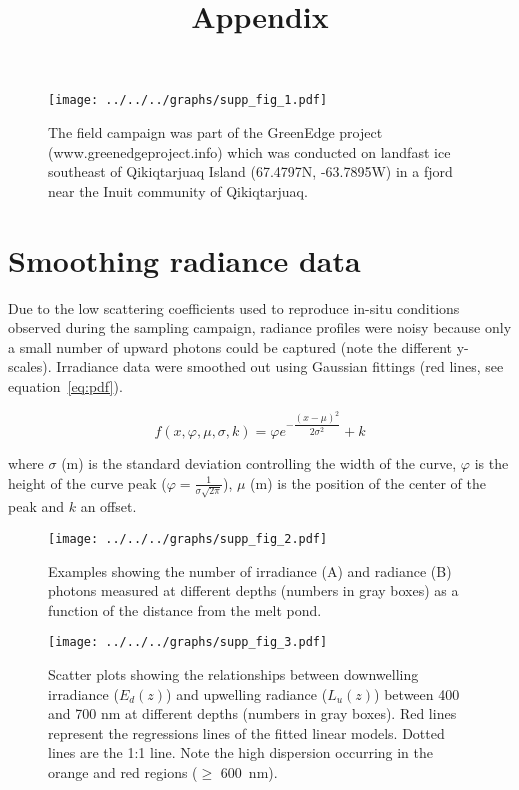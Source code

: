 \documentclass[12pt,a4paper]{scrartcl}
\title{Appendix}
\date{}
\newcommand{\edz}{\ensuremath{{E_d(z)}}}
\newcommand{\luz}{\ensuremath{{L_u(z)}}}
\begin{document}
\maketitle

\begin{figure}[h]
	\centering
	\texttt{[image: ../../../graphs/supp\_fig\_1.pdf]}
	\caption{The field campaign was part of the GreenEdge project (www.greenedgeproject.info)  which was conducted on landfast ice southeast of Qikiqtarjuaq Island (67.4797N, -63.7895W) in a fjord near the Inuit community of Qikiqtarjuaq.}
\end{figure}

\clearpage
\newpage

\section*{Smoothing radiance data}

Due to the low scattering coefficients used to reproduce in-situ conditions observed during the sampling campaign, radiance profiles were noisy because only a small number of upward photons could be captured (note the different y-scales). Irradiance data were smoothed out using Gaussian fittings (red lines, see equation~\ref{eq:pdf}).

\begin{equation}
	\label{eq:pdf}
	f(x,\varphi,\mu,\sigma, k) = \varphi e^{-\dfrac{(x-\mu)^2}{2 \sigma^2}} + k
\end{equation}

where $\sigma$ (m) is the standard deviation controlling the width of the curve, $\varphi$ is the height of the curve peak ($\varphi = \frac{1}{\sigma\sqrt{2\pi}}$), $\mu$ (m) is the position of the center of the peak and $k$ an offset.

\begin{figure}[h]
	\centering
	\texttt{[image: ../../../graphs/supp\_fig\_2.pdf]}
	\caption{Examples showing the number of irradiance (A) and radiance (B) photons measured at different depths (numbers in gray boxes) as a function of the distance from the melt pond.}
\end{figure}

\clearpage
\newpage

\begin{figure}[H]
	\centering
	\texttt{[image: ../../../graphs/supp\_fig\_3.pdf]}
	\caption{Scatter plots showing the relationships between downwelling irradiance (\edz{}) and upwelling radiance (\luz{}) between 400 and 700 nm at different depths (numbers in gray boxes). Red lines represent the regressions lines of the fitted linear models. Dotted lines are the 1:1 line. Note the high dispersion occurring in the orange and red regions ($\ge$ 600~nm).}
\end{figure}
\end{document}
